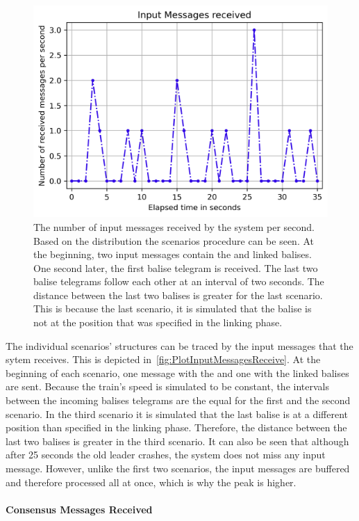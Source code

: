 \begin{figure}[!hb]
	\centering
	\includegraphics[width=0.75\linewidth]{images/plots/InputMessagesReceive}
	\caption{The number of input messages received by the system per second. Based on the distribution the scenarios procedure can be seen. At the beginning, two input messages contain the  and linked balises. One second later, the first balise telegram is received. The last two balise telegrams follow each other at an interval of two seconds. The distance between the last two balises is greater for the last scenario. This is because the last scenario, it is simulated that the balise is not at the position that was specified in the linking phase.}
	\label{fig:PlotInputMessagesReceive}
\end{figure}

The individual scenarios' structures can be traced by the input messages that the sytem receives.
This is depicted in~\autoref{fig:PlotInputMessagesReceive}.
At the beginning of each scenario, one message with the  and one with the linked balises are sent.
Because the train's speed is simulated to be constant, the intervals between the incoming balises telegrams are the equal for the first and the second scenario.
In the third scenario it is simulated that the last balise is at a different position than specified in the linking phase.
Therefore, the distance between the last two balises is greater in the third scenario.
It can also be seen that although after 25 seconds the old leader crashes, the system does not miss any input message.
However, unlike the first two scenarios, the input messages are buffered and therefore processed all at once, which is why the peak is higher.

\paragraph{Consensus Messages Received}

